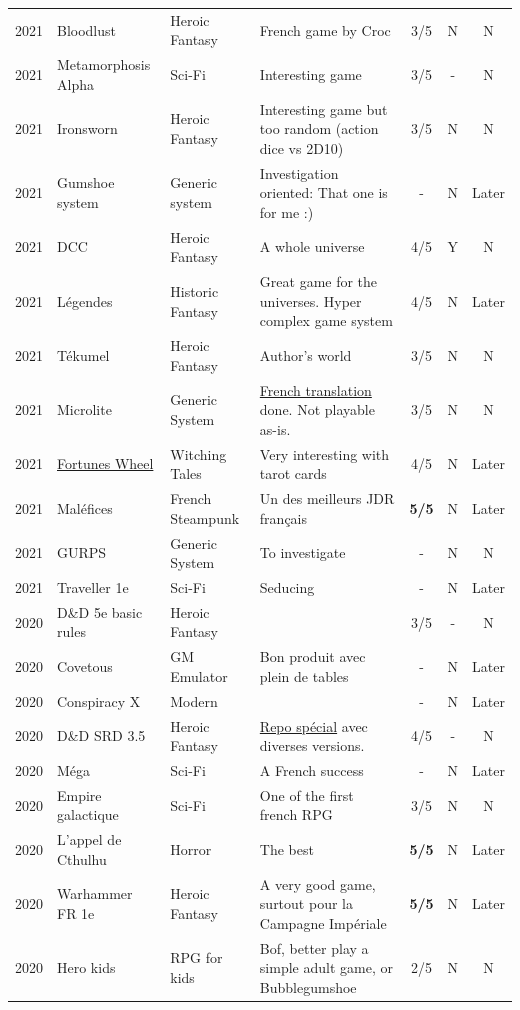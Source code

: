 \documentclass[a4paper, 11pt, twoside]{article}
\begin{document}
\begin{longtable}{cp{2cm}p{1.5cm}p{7cm}ccc}
2021 & Bloodlust & Heroic Fantasy & French game by Croc & 3/5 & N & N\\
2021 & Metamorphosis Alpha & Sci-Fi & Interesting game & 3/5 & - & N\\
2021 & Ironsworn & Heroic Fantasy & Interesting game but too random (action dice vs 2D10) & 3/5 & N & N\\
2021 & Gumshoe system & Generic system & Investigation oriented: That one is for me :) & - & N & Later\\
2021 & DCC & Heroic Fantasy & A whole universe & 4/5 & Y & N\\
2021 & Légendes & Historic Fantasy & Great game for the universes. Hyper complex game system & 4/5 & N & Later\\
2021 & Tékumel & Heroic Fantasy & Author's world & 3/5 & N & N\\
2021 & Microlite & Generic System & \href{https://github.com/orey/jdr/tree/master/Microlite20-fr}{French translation} done. Not playable as-is. & 3/5 & N & N\\
2021 & \href{http://www.fortuneswheel.co.uk/}{Fortunes Wheel} & Witching Tales & Very interesting with tarot cards & 4/5 & N & Later\\
2021 & Maléfices & French Steampunk & Un des meilleurs JDR français & \textbf{5/5} & N & Later\\
2021 & GURPS & Generic System & To investigate & - & N & N\\
2021 & Traveller 1e & Sci-Fi & Seducing & - & N & Later\\
2020 & D\&D 5e basic rules & Heroic Fantasy &  & 3/5 & - & N\\
2020 & Covetous & GM Emulator & Bon produit avec plein de tables & - & N & Later\\
2020 & Conspiracy X & Modern &  & - & N & Later\\
2020 & D\&D SRD 3.5 & Heroic Fantasy & \href{https://github.com/orey/srd-3.5}{Repo spécial} avec diverses versions. & 4/5 & - & N\\
2020 & Méga & Sci-Fi & A French success & - & N & Later\\
2020 & Empire galactique & Sci-Fi & One of the first french RPG & 3/5 & N & N\\
2020 & L'appel de Cthulhu & Horror & The best & \textbf{5/5} & N & Later\\
2020 & Warhammer FR 1e & Heroic Fantasy & A very good game, surtout pour la Campagne Impériale & \textbf{5/5} & N & Later\\
2020 & Hero kids & RPG for kids & Bof, better play a simple adult game, or Bubblegumshoe & 2/5 & N & N\\

\end{longtable}
\end{document}
